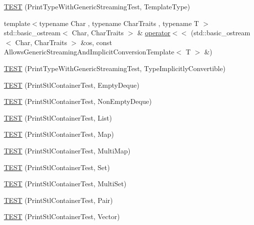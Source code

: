 \begin{DoxyCompactItemize}
\item 
\hyperlink{namespacetesting_1_1gtest__printers__test_a6e180c85f307712a995985f7bc735fd1}{\-T\-E\-S\-T} (\-Print\-Type\-With\-Generic\-Streaming\-Test, \-Template\-Type)
\item 
{\footnotesize template$<$typename Char , typename Char\-Traits , typename T $>$ }\\std\-::basic\-\_\-ostream$<$ \-Char, \*
\-Char\-Traits $>$ \& \hyperlink{namespacetesting_1_1gtest__printers__test_a09eedfbca613302efe6438d2a537f419}{operator$<$$<$} (std\-::basic\-\_\-ostream$<$ \-Char, \-Char\-Traits $>$ \&os, const \-Allows\-Generic\-Streaming\-And\-Implicit\-Conversion\-Template$<$ \-T $>$ \&)
\item 
\hyperlink{namespacetesting_1_1gtest__printers__test_a68877c5e1ec7a53281798310c30e1776}{\-T\-E\-S\-T} (\-Print\-Type\-With\-Generic\-Streaming\-Test, \-Type\-Implicitly\-Convertible)
\item 
\hyperlink{namespacetesting_1_1gtest__printers__test_a1ce10b8a3634e0f6bfbfbb5888c04a95}{\-T\-E\-S\-T} (\-Print\-Stl\-Container\-Test, \-Empty\-Deque)
\item 
\hyperlink{namespacetesting_1_1gtest__printers__test_a249d482cf4a1525bd043489dcbd3e200}{\-T\-E\-S\-T} (\-Print\-Stl\-Container\-Test, \-Non\-Empty\-Deque)
\item 
\hyperlink{namespacetesting_1_1gtest__printers__test_aaa135672ff79ecaef82c6046f2ab8d29}{\-T\-E\-S\-T} (\-Print\-Stl\-Container\-Test, \-List)
\item 
\hyperlink{namespacetesting_1_1gtest__printers__test_a3d701a1866f260a42411e9041894c49c}{\-T\-E\-S\-T} (\-Print\-Stl\-Container\-Test, \-Map)
\item 
\hyperlink{namespacetesting_1_1gtest__printers__test_a8a498c956a5b1c0358d126e1ad56fac0}{\-T\-E\-S\-T} (\-Print\-Stl\-Container\-Test, \-Multi\-Map)
\item 
\hyperlink{namespacetesting_1_1gtest__printers__test_abdc498462741033074f8e86b7c0bd480}{\-T\-E\-S\-T} (\-Print\-Stl\-Container\-Test, \-Set)
\item 
\hyperlink{namespacetesting_1_1gtest__printers__test_adaa3e1cfa3feca377b3958edb41fc0f1}{\-T\-E\-S\-T} (\-Print\-Stl\-Container\-Test, \-Multi\-Set)
\item 
\hyperlink{namespacetesting_1_1gtest__printers__test_ad5d3e873b00c1c9e3f5924e106dd7831}{\-T\-E\-S\-T} (\-Print\-Stl\-Container\-Test, \-Pair)
\item 
\hyperlink{namespacetesting_1_1gtest__printers__test_abfab1ea62f0285c0cdbcca500be0dac8}{\-T\-E\-S\-T} (\-Print\-Stl\-Container\-Test, \-Vector)

\end{DoxyCompactItemize}
